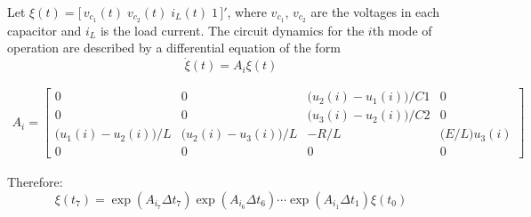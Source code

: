 \documentclass[11pt, letterpaper]{article}
\begin{document}
Let $\xi(t) = \big[\,v_{c_1}(t) \; v_{c_2}(t) \; i_L(t) \; 1 \,\big]'$, where $v_{c_1}$, $v_{c_2}$ are the voltages in each capacitor and $i_L$ is the load current. The circuit dynamics for the $i$th mode of operation are described by a differential equation of the form
%
\begin{equation}
\dot{\xi}(t) = A_i \xi(t)
\end{equation}

\begin{equation}
    \begin{matrix}
        A_i = \left[ 
            \begin{matrix} 
                0 &       0 & \Big(u_2(i)-u_1(i)\Big)/C1 & 0 \\ 
                0 & 0 & \Big(u_3(i)-u_2(i)\Big)/C2 & 0 \\ 
                \Big(u_1(i)-u_2(i)\Big)/L & \Big(u_2(i)-u_3(i)\Big)/L & -R/L & \Big(E/L\Big) u_3(i)\\ 
                0 & 0 & 0 & 0
            \end{matrix} \right]
    \end{matrix}
\end{equation}

Therefore:
%
\begin{equation}
\xi(t_7) = \exp(A_{i_7} \Delta t_7) \exp(A_{i_6} \Delta t_6) \cdots \exp(A_{i_1} \Delta t_1) \xi(t_0)
\end{equation}    
\end{document}
